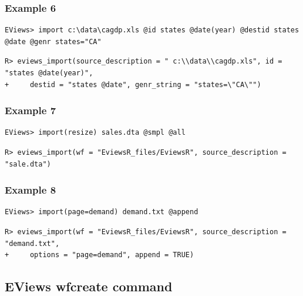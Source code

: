 \hypertarget{example-6-1}{%
\subsubsection{Example 6}\label{example-6-1}}

\begin{verbatim}
EViews> import c:\data\cagdp.xls @id states @date(year) @destid states @date @genr states="CA"
\end{verbatim}

\begin{verbatim}
R> eviews_import(source_description = " c:\\data\\cagdp.xls", id = "states @date(year)",
+     destid = "states @date", genr_string = "states=\"CA\"")
\end{verbatim}

\hypertarget{example-7-1}{%
\subsubsection{Example 7}\label{example-7-1}}

\begin{verbatim}
EViews> import(resize) sales.dta @smpl @all
\end{verbatim}

\begin{verbatim}
R> eviews_import(wf = "EviewsR_files/EviewsR", source_description = "sale.dta")
\end{verbatim}

\hypertarget{example-8-1}{%
\subsubsection{Example 8}\label{example-8-1}}

\begin{verbatim}
EViews> import(page=demand) demand.txt @append
\end{verbatim}

\begin{verbatim}
R> eviews_import(wf = "EviewsR_files/EviewsR", source_description = "demand.txt",
+     options = "page=demand", append = TRUE)
\end{verbatim}

\hypertarget{eviews-wfcreate-command}{%
\subsection{EViews wfcreate command}\label{eviews-wfcreate-command}}

